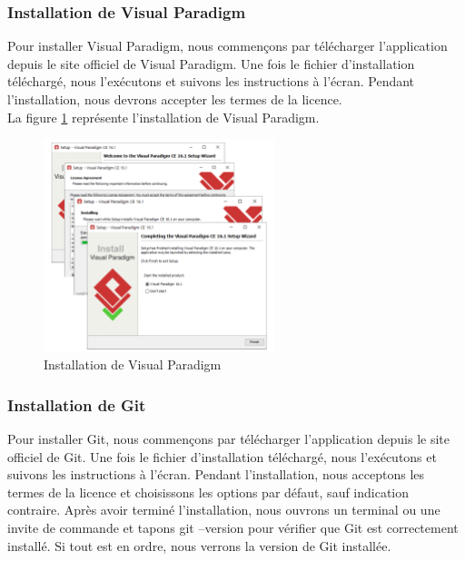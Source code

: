 \documentclass[12pt]{report}
\begin{document}
			\subsubsection{Installation de Visual Paradigm}

			\hspace{15pt} Pour installer Visual Paradigm, nous commençons par télécharger l'application depuis le site officiel de Visual Paradigm. Une fois le fichier d'installation téléchargé, nous l'exécutons et suivons les instructions à l'écran. Pendant l'installation, nous devrons accepter les termes de la licence.\\

			La figure \ref{fig:vispar} représente l’installation de Visual Paradigm.
			
			\begin{figure}[h]
				\centering
				\includegraphics[width=0.6\textwidth]{vispar.png}
				\caption{Installation de Visual Paradigm}
				\label{fig:vispar}
			\end{figure}
			\FloatBarrier

			\subsubsection{Installation de Git}

			\hspace{15pt} Pour installer Git, nous commençons par télécharger l'application depuis le site officiel de Git. Une fois le fichier d'installation téléchargé, nous l'exécutons et suivons les instructions à l'écran. Pendant l'installation, nous acceptons les termes de la licence et choisissons les options par défaut, sauf indication contraire. Après avoir terminé l'installation, nous ouvrons un terminal ou une invite de commande et tapons git --version pour vérifier que Git est correctement installé. Si tout est en ordre, nous verrons la version de Git installée.\\
\end{document}
